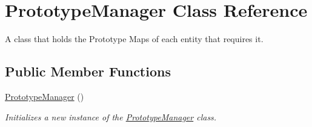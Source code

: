 \hypertarget{class_prototype_manager}{}\section{Prototype\+Manager Class Reference}
\label{class_prototype_manager}


A class that holds the Prototype Maps of each entity that requires it.  


\subsection*{Public Member Functions}
\begin{DoxyCompactItemize}
\item 
\hyperlink{class_prototype_manager_a9392bb86cd33a73f3729e220e5461bc9}{Prototype\+Manager} ()
\begin{DoxyCompactList}\small\item\em Initializes a new instance of the \hyperlink{class_prototype_manager}{Prototype\+Manager} class. \end{DoxyCompactList}\end{DoxyCompactItemize}
